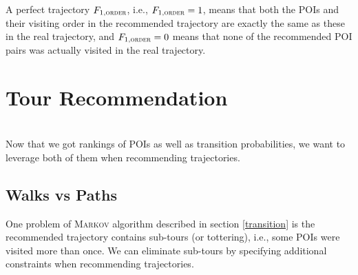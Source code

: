 A perfect trajectory $F_{1,\textsc{order}}$, i.e., $F_{1,\textsc{order}} = 1$, means that both the POIs and their visiting order in the
recommended trajectory are exactly the same as these in the real trajectory,
and $F_{1,\textsc{order}} = 0$ means that none of the recommended POI pairs was actually visited in the real trajectory.


\section{Tour Recommendation}
\label{recommendation}

 \\
Now that we got rankings of POIs as well as transition probabilities,
we want to leverage both of them when recommending trajectories.

\subsection{Walks vs Paths}
\label{walkpath}
%
One problem of \textsc{Markov} algorithm described in section \ref{transition} is the recommended
trajectory contains sub-tours (or tottering), i.e., some POIs were visited more than once.
We can eliminate sub-tours by specifying additional constraints when recommending trajectories.

